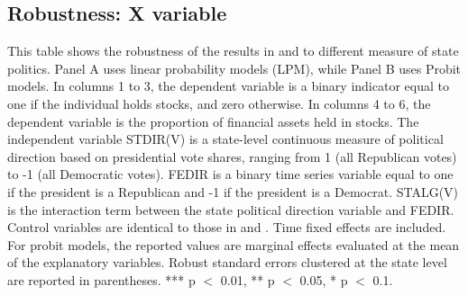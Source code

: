 \subsection{Robustness: X variable}
\label{sec:robust_x}

\begin{table}[htbp]
    \centering
    \caption{State Politics as Election Results}
    \label{tab:5}

    \begin{minipage}{\textwidth}
    \small This table shows the robustness of the results in  and  to different measure of state politics. Panel A uses linear probability models (LPM), while Panel B uses Probit models. In columns 1 to 3, the dependent variable is a binary indicator equal to one if the individual holds stocks, and zero otherwise. In columns 4 to 6, the dependent variable is the proportion of financial assets held in stocks. The independent variable STDIR(V) is a state-level continuous measure of political direction based on presidential vote shares, ranging from 1 (all Republican votes) to -1 (all Democratic votes). FEDIR is a binary time series variable equal to one if the president is a Republican and -1 if the president is a Democrat. STALG(V) is the interaction term between the state political direction variable and FEDIR. Control variables are identical to those in  and . Time fixed effects are included. For probit models, the reported values are marginal effects evaluated at the mean of the explanatory variables. Robust standard errors clustered at the state level are reported in parentheses. *** p $<$ 0.01, ** p $<$ 0.05, * p $<$ 0.1.
    \end{minipage}

    \small 

    \vspace{1ex}
    
    \begin{subtable}{\textwidth}
        \caption{Linear Probability Model (LPM)}
        \label{tab:5a}
        
    \end{subtable}
\end{table}

\begin{table}[htbp]
    \ContinuedFloat
    \centering

    \caption[]{State Politics as Election Results (Cont.)}
    
    \small
    
    \begin{subtable}{\textwidth}
        \caption{Fractional Probit Model}
        \label{tab:5b}
        
    \end{subtable}
\end{table}


